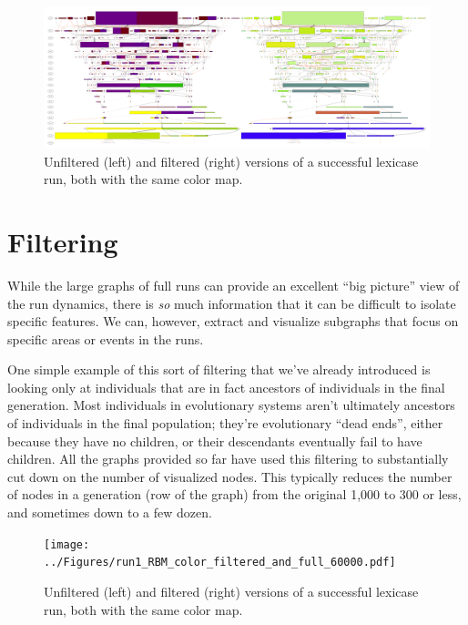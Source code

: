 \documentclass{sig-alternate}
\begin{document}
\begin{figure}
	\begin{center}
		\includegraphics[width=\textwidth]{../Figures/run0_dual_and_RBM_full.pdf}
	\end{center}
	\caption{Unfiltered (left) and filtered (right) versions of a successful lexicase run, both with the same color map.}
	\label{fig:lexRun0FilteredAndFull}
\end{figure}

\section{Filtering}
\label{sec:filtering}

While the large graphs of full runs can provide an excellent ``big picture'' 
view of the run dynamics, there is \emph{so} much information that it can be
difficult to isolate specific features. We can, however, extract and visualize
subgraphs that focus on specific areas or events in the runs.

One simple example of this sort of filtering that we've already introduced is
looking only at individuals that are in fact ancestors of individuals in the
final generation. Most individuals in evolutionary systems aren't ultimately
ancestors of individuals in the final population; they're evolutionary ``dead ends'',
either because they have no children, or their descendants eventually fail to have
children. All the graphs provided so far have used this filtering to substantially
cut down on the number of visualized nodes. This typically reduces the number of nodes in a
generation (row of the graph) from the original 1,000 to 300 or less, and sometimes down
to a few dozen.

\begin{figure}[tb]
	\begin{center}
		\texttt{[image: ../Figures/run1\_RBM\_color\_filtered\_and\_full\_60000.pdf]}
	\end{center}
	\caption{Unfiltered (left) and filtered (right) versions of a successful lexicase run, both with the same color map.}
	\label{fig:lexRun1FilteredAndFull}
\end{figure}
\end{document}
